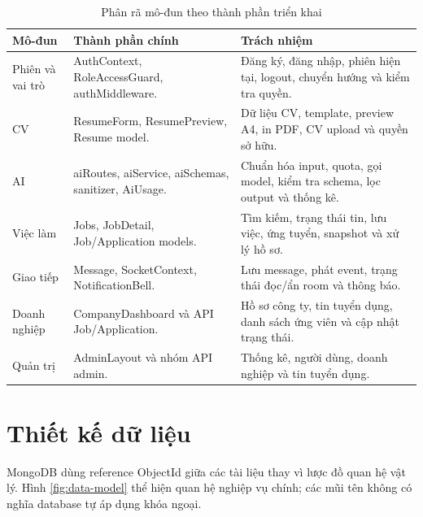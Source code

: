 \begin{table}[H]
    \centering
    \small
    \begin{tabularx}{\textwidth}{|p{}|p{}|Y|} \hline
        \textbf{Mô-đun} & \textbf{Thành phần chính} & \textbf{Trách nhiệm} \\ \hline
        Phiên và vai trò & AuthContext, RoleAccessGuard, authMiddleware. & Đăng ký, đăng nhập, phiên hiện tại, logout, chuyển hướng và kiểm tra quyền. \\ \hline
        CV & ResumeForm, ResumePreview, Resume model. & Dữ liệu CV, template, preview A4, in PDF, CV upload và quyền sở hữu. \\ \hline
        AI & aiRoutes, aiService, aiSchemas, sanitizer, AiUsage. & Chuẩn hóa input, quota, gọi model, kiểm tra schema, lọc output và thống kê. \\ \hline
        Việc làm & Jobs, JobDetail, Job/Application models. & Tìm kiếm, trạng thái tin, lưu việc, ứng tuyển, snapshot và xử lý hồ sơ. \\ \hline
        Giao tiếp & Message, SocketContext, NotificationBell. & Lưu message, phát event, trạng thái đọc/ẩn room và thông báo. \\ \hline
        Doanh nghiệp & CompanyDashboard và API Job/Application. & Hồ sơ công ty, tin tuyển dụng, danh sách ứng viên và cập nhật trạng thái. \\ \hline
        Quản trị & AdminLayout và nhóm API admin. & Thống kê, người dùng, doanh nghiệp và tin tuyển dụng. \\ \hline
    \end{tabularx}
    \caption{Phân rã mô-đun theo thành phần triển khai}
    \label{tab:module-design}
\end{table}

\section{Thiết kế dữ liệu}

MongoDB dùng reference ObjectId giữa các tài liệu thay vì lược đồ quan hệ vật lý. Hình \ref{fig:data-model} thể hiện quan hệ nghiệp vụ chính; các mũi tên không có nghĩa database tự áp dụng khóa ngoại.

